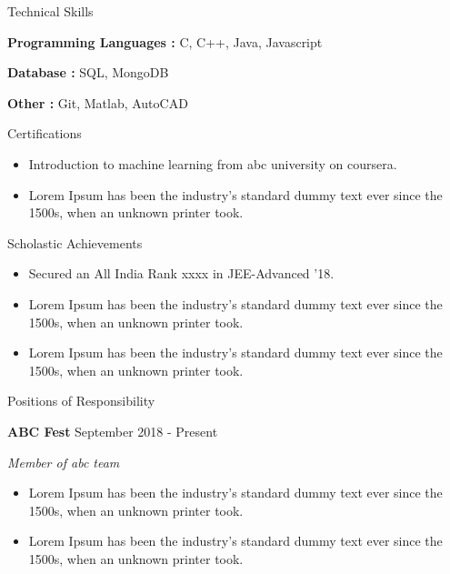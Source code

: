 \documentclass{article}
\newcommand{\sbt}{\,\begin{picture}(-1,1)(-1,-3)\circle*{2}\end{picture}\ }
\begin{document}
{{\medskip
\Large {Technical Skills} \hrulefill \par
\smallskip
\normalsize { {\bf Programming Languages :}  C, C++, Java, Javascript } \par
\normalsize { {\bf Database :} SQL, MongoDB } \par
\normalsize { {\bf Other :} Git, Matlab, AutoCAD} \par




\medskip
\Large {Certifications} \hrulefill \par
\vspace{-2mm}
\normalsize
\begin{itemize}[noitemsep]
  \item[\sbt] Introduction to machine learning from abc university on coursera.
  \item[\sbt] Lorem Ipsum has been the industry's standard dummy text ever since the 1500s, when an unknown printer took.
\end{itemize}




\medskip
{\Large Scholastic Achievements} \hrulefill \par
\vspace{-2mm}
\begin{itemize}[noitemsep]
  \item[\sbt] Secured an All India Rank xxxx in JEE-Advanced ’18.
  \item[\sbt] Lorem Ipsum has been the industry's standard dummy text ever since the 1500s, when an unknown printer took.
  \item[\sbt] Lorem Ipsum has been the industry's standard dummy text ever since the 1500s, when an unknown printer took.
\end{itemize}




\medskip
\Large {Positions of Responsibility} \hrulefill \par

\smallskip
\normalsize {{\bf ABC Fest} \hspace*{\fill} {September 2018 - Present} \par}
\normalsize {\it Member of abc team} \par
\vspace{-2mm}
\begin{itemize}[noitemsep]
  \item[\sbt] Lorem Ipsum has been the industry's standard dummy text ever since the 1500s, when an unknown printer took.
  \item[\sbt] Lorem Ipsum has been the industry's standard dummy text ever since the 1500s, when an unknown printer took.
\end{itemize}




}}
\end{document}
